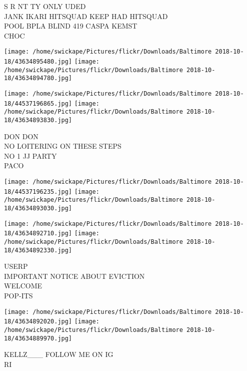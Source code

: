 \documentclass[10pt,letterpaper]{article}
\begin{document}
S R NT TY ONLY UDED\\
JANK IKARI HITSQUAD KEEP HAD HITSQUAD\\
POOL BPLA BLIND 419 CASPA KEMST\\
CHOC\\
\pagebreak

\texttt{[image: /home/swickape/Pictures/flickr/Downloads/Baltimore 2018-10-18/43634895480.jpg]}
\texttt{[image: /home/swickape/Pictures/flickr/Downloads/Baltimore 2018-10-18/43634894780.jpg]}

\texttt{[image: /home/swickape/Pictures/flickr/Downloads/Baltimore 2018-10-18/44537196865.jpg]}
\texttt{[image: /home/swickape/Pictures/flickr/Downloads/Baltimore 2018-10-18/43634893830.jpg]}

DON DON\\
NO LOITERING ON THESE STEPS\\
NO 1 JJ PARTY\\
PACO\\
\pagebreak

\texttt{[image: /home/swickape/Pictures/flickr/Downloads/Baltimore 2018-10-18/44537196235.jpg]}
\texttt{[image: /home/swickape/Pictures/flickr/Downloads/Baltimore 2018-10-18/43634893030.jpg]}

\texttt{[image: /home/swickape/Pictures/flickr/Downloads/Baltimore 2018-10-18/43634892710.jpg]}
\texttt{[image: /home/swickape/Pictures/flickr/Downloads/Baltimore 2018-10-18/43634892330.jpg]}

USERP\\
IMPORTANT NOTICE ABOUT EVICTION\\
WELCOME\\
POP{-}ITS\\
\pagebreak

\texttt{[image: /home/swickape/Pictures/flickr/Downloads/Baltimore 2018-10-18/43634892020.jpg]}
\texttt{[image: /home/swickape/Pictures/flickr/Downloads/Baltimore 2018-10-18/43634889970.jpg]}

KELLZ\_\_\_ FOLLOW ME ON IG\\
RI\\
\pagebreak
\end{document}

